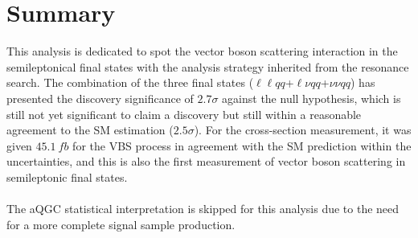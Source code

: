 \section{Summary}
This analysis is dedicated to spot the vector boson scattering interaction in the semileptonical final states with the analysis strategy inherited from the resonance search. The combination of the three final states ($\ell\ell qq$+$\ell\nu qq$+$\nu\nu qq$) has presented the discovery significance of $2.7\sigma$  against the null hypothesis, which is still not yet significant to claim a discovery but still within a reasonable agreement to the SM estimation ($2.5\sigma$). For the cross-section measurement, it was given $45.1~fb$ for the VBS process in agreement with the SM prediction within the uncertainties, and this is also the first measurement of vector boson scattering in semileptonic final states. 
\\
\\The aQGC statistical interpretation is skipped for this analysis due to the need for a more complete signal sample production. 